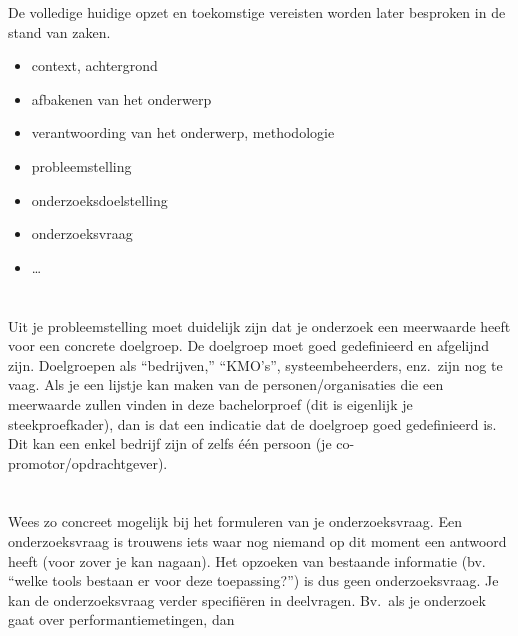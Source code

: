 De volledige huidige opzet en toekomstige vereisten worden later besproken in de stand van zaken.


\begin{itemize}
  \item context, achtergrond
  \item afbakenen van het onderwerp
  \item verantwoording van het onderwerp, methodologie
  \item probleemstelling
  \item onderzoeksdoelstelling
  \item onderzoeksvraag
  \item \ldots
\end{itemize}

\section{}%
\label{sec:probleemstelling}

Uit je probleemstelling moet duidelijk zijn dat je onderzoek een meerwaarde heeft voor een concrete doelgroep. De doelgroep moet goed gedefinieerd en afgelijnd zijn. 
Doelgroepen als ``bedrijven,'' ``KMO's'', systeembeheerders, enz.~zijn nog te vaag. 
Als je een lijstje kan maken van de personen/organisaties die een meerwaarde zullen vinden in deze bachelorproef (dit is eigenlijk je steekproefkader), 
dan is dat een indicatie dat de doelgroep goed gedefinieerd is.
Dit kan een enkel bedrijf zijn of zelfs één persoon (je co-promotor/opdrachtgever).

\section{}%
\label{sec:onderzoeksvraag}

Wees zo concreet mogelijk bij het formuleren van je onderzoeksvraag. 
Een onderzoeksvraag is trouwens iets waar nog niemand op dit moment een antwoord heeft (voor zover je kan nagaan). 
Het opzoeken van bestaande informatie (bv. ``welke tools bestaan er voor deze toepassing?'') is dus geen onderzoeksvraag. 
Je kan de onderzoeksvraag verder specifiëren in deelvragen. Bv.~als je onderzoek gaat over performantiemetingen, dan 


\section{}%
\label{sec:onderzoeksdoelstelling}

